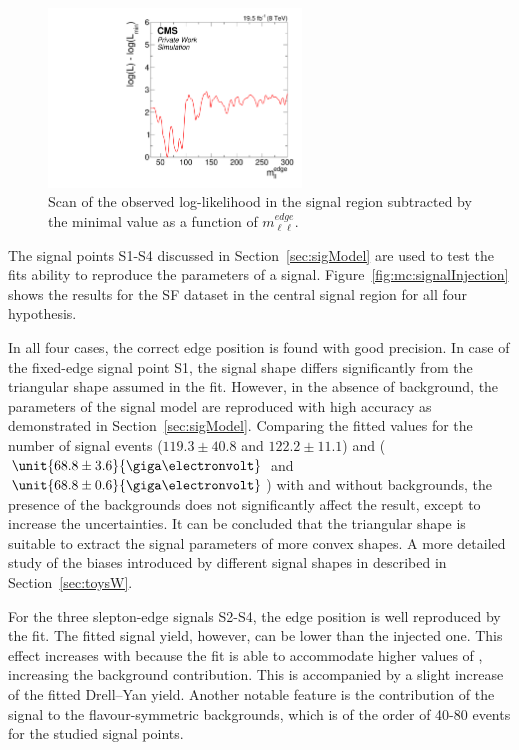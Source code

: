 \begin{figure}[htbp]
\centering
  \includegraphics[width=0.6\textwidth]{plots/results/fit/mcFits/MC.pdf}
\caption{Scan of the observed log-likelihood in the signal region subtracted by the minimal value as a function of $m_{\ell\ell}^{edge}$.}
\label{fig:mc:bgOnlyProfile}
\end{figure}

The signal points S1-S4 discussed in Section~\ref{sec:sigModel} are used to test the fits ability to reproduce the parameters of a signal. Figure~\ref{fig:mc:signalInjection} shows the results for the SF dataset in the central signal region for all four hypothesis. 

In all four cases, the correct edge position is found with good precision. In case of the fixed-edge signal point S1, the signal shape differs significantly from the triangular shape assumed in the fit. However, in the absence of background, the parameters of the signal model are reproduced with high accuracy as demonstrated in Section~\ref{sec:sigModel}. Comparing the fitted values for the number of signal events ($119.3\pm40.8$ and $122.2\pm11.1$) and \mlledge ($\unit{68.8\pm3.6}{\giga\electronvolt}$ and $\unit{68.8\pm0.6}{\giga\electronvolt}$) with and without backgrounds, the presence of the backgrounds does not significantly affect the result, except to increase the uncertainties. It can be concluded that the triangular shape is suitable to extract the signal parameters of more convex shapes. A more detailed study of the biases introduced by different signal shapes in described in Section~\ref{sec:toysW}. 

For the three slepton-edge signals S2-S4, the edge position is well reproduced by the fit. The fitted signal yield, however, can be lower than the injected one. This effect increases with \mlledge because the fit is able to accommodate higher values of \Rsfof, increasing the background contribution. This is accompanied by a slight increase of the fitted Drell--Yan yield. Another notable feature is the contribution of the signal to the flavour-symmetric backgrounds, which is of the order of 40-80 events for the studied signal points.

